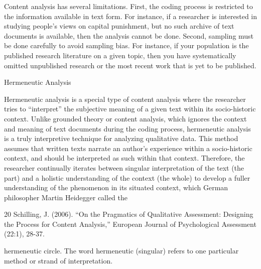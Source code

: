 Content analysis has several limitations. First, the coding process is restricted to the information available in text form. For instance, if a researcher is interested in studying people’s views on capital punishment, but no such archive of text documents is available, then the analysis cannot be done. Second, sampling must be done carefully to avoid sampling bias. For instance, if your population is the published research literature on a given topic, then you have systematically omitted unpublished research or the most recent work that is yet to be published.

Hermeneutic Analysis

Hermeneutic analysis is a special type of content analysis where the researcher tries to “interpret” the subjective meaning of a given text within its socio-historic context. Unlike grounded theory or content analysis, which ignores the context and meaning of text documents during the coding process, hermeneutic analysis is a truly interpretive technique for analyzing qualitative data. This method assumes that written texts narrate an author’s experience within a socio-historic context, and should be interpreted as such within that context. Therefore, the researcher continually iterates between singular interpretation of the text (the part) and a holistic understanding of the context (the whole) to develop a fuller understanding of the phenomenon in its situated context, which German philosopher Martin Heidegger called the 

20 Schilling, J. (2006). “On the Pragmatics of Qualitative Assessment: Designing the Process for Content Analysis,” European Journal of Psychological Assessment (22:1), 28-37.


hermeneutic circle. The word hermeneutic (singular) refers to one particular method or strand of interpretation.

